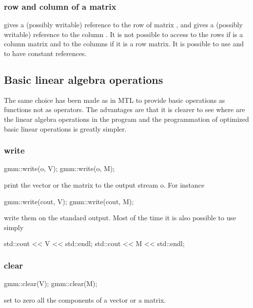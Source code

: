 \documentclass[11pt,a4paper]{article}
\begin{document}
\subsubsection{row and column of a matrix}
 gives a (possibly writable) reference to the row  of matrix , and   gives a (possibly writable) reference to the column . It is not possible to access to the rows if  is a column matrix and to the columns if it is a row matrix. It is possible to use  and  to have constant references.


\subsection{Basic linear algebra operations}
The same choice has been made as in MTL to provide basic operations as functions not as operators. The advantages are that it is clearer to see where are the linear algebra operations in the program and the programmation of optimized basic linear operations is greatly simpler.

\subsubsection{write}
\begin{cppcode}
  gmm::write(o, V); gmm::write(o, M);
\end{cppcode}
print the vector or the matrix to the output stream o. For instance
\begin{cppcode}
  gmm::write(cout, V); gmm::write(cout, M);
\end{cppcode}
write them on the standard output.
Most of the time it is also possible to use simply
\begin{cppcode}
  std::cout << V << std::endl; std::cout << M << std::endl;
\end{cppcode}

\subsubsection{clear}
\begin{cppcode}
  gmm::clear(V); gmm::clear(M);
\end{cppcode}
set to zero all the components of a vector or a matrix.
\end{document}
